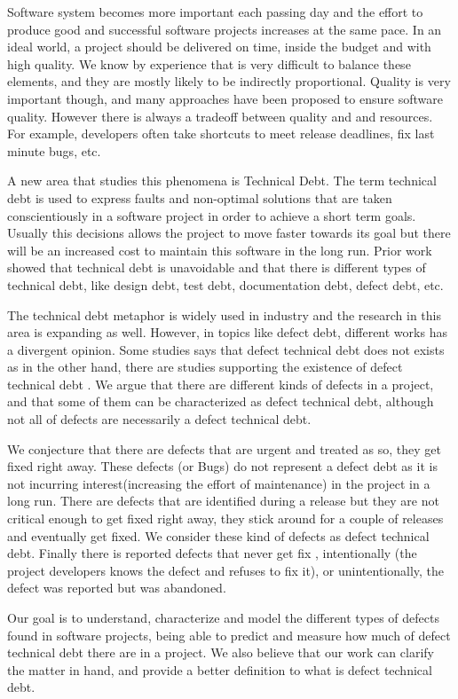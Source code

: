 Software system becomes more important each passing day and the effort to produce good and successful software projects increases at the same pace. In an ideal world,  a project  should be delivered on time, inside the budget and with high quality. We know by experience that is very  difficult to balance these elements, and they are mostly likely to be indirectly proportional. Quality is very important though, and many approaches have been proposed to ensure software quality. However there is always a tradeoff between quality and and resources. For example, developers often take shortcuts to meet release deadlines, fix last minute bugs, etc.

A new area that studies this phenomena is Technical Debt. The term technical debt is used to express faults and non-optimal solutions that are taken conscientiously in a software project in order to achieve a short term goals. Usually  this decisions allows the project to move faster towards its goal but there will be an increased cost to maintain this software in the long run. Prior work showed that technical debt is unavoidable and that there is different types of technical debt, like design debt, test debt, documentation debt, defect debt, etc. 

The technical debt metaphor is widely used in industry and the research in this area is expanding as well. However, in topics like defect debt, different works has a divergent opinion. Some studies says that defect technical debt does not exists \cite{Kruchten2013GSOFT} as in the other hand, there are studies supporting the existence of defect technical debt \cite{Seaman201125}. We argue that there are different kinds of defects in a project, and that some of them can be characterized as defect technical debt, although not all of defects are necessarily  a defect technical debt. 

We conjecture that there are defects that are urgent and treated as so, they get fixed right away. These defects (or Bugs) do not represent a defect debt as it is not incurring interest(increasing the effort of maintenance) in the project in a long run. There are defects that are identified during a release but they are not critical enough to get fixed right away, they stick around for a couple of releases and eventually get fixed. We consider these kind of defects as defect technical debt. Finally there is reported defects that never get fix , intentionally (the project developers knows the defect and refuses to fix it), or unintentionally, the defect was reported but was abandoned. 

Our goal is to understand, characterize and model the different types of defects found in software projects, being able to predict and measure how much of defect technical debt there are in a project. We also believe that our work can clarify the matter in hand, and provide a better definition to what is defect technical debt. 